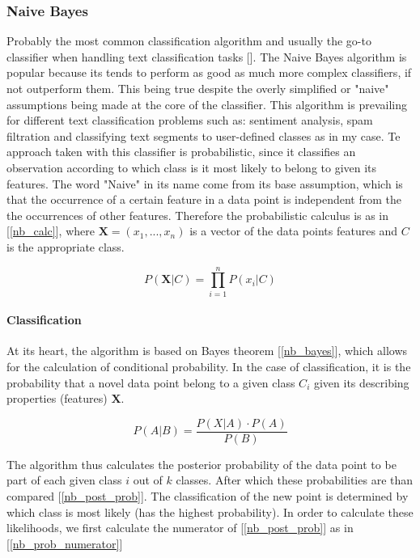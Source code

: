 \subsubsection{Naive Bayes}
	Probably the most common classification algorithm and usually the go-to classifier when handling text classification tasks [\cite{rish2001empirical}]. The Naive Bayes algorithm is popular because its tends to perform as good as much more complex classifiers, if not outperform them. This being true despite the overly simplified or "naive" assumptions being made at the core of the classifier. This algorithm is prevailing for different text classification problems such as: sentiment analysis, spam filtration and classifying text segments to user-defined classes as in my case. Te approach taken with this classifier is probabilistic, since it classifies an observation according to which class is it most likely to belong to given its features. 
	The word "Naive" in its name come from its base assumption, which is that the occurrence of a certain feature in a data point is independent from the the occurrences of other features. Therefore the probabilistic calculus is as in [\ref{nb_calc}], where $ \textbf{X} = (x_1,...,x_n) $ is a vector of the data points features and $ C $ is the appropriate class.
	
	\begin{equation}
		P(\textbf{X}|C) = \prod_{i=1}^n P(x_i|C)
		\label{nb_calc}
	\end{equation}
	
	\paragraph{Classification}
		At its heart, the algorithm is based on Bayes theorem [\ref{nb_bayes}], which allows for the calculation of conditional probability. In the case of classification, it is the probability that a novel data point belong to a given class $ C_i $ given its describing properties (features) $ \textbf{X} $.
	
	\begin{equation}
		P(A|B) = \frac{P(X|A) \cdot P(A)}{P(B)}
		\label{nb_bayes}
	\end{equation}
	
		The algorithm thus calculates the posterior probability of the data point to be part of each given class $ i $  out of $ k $ classes. After which these probabilities are than compared [\ref{nb_post_prob}]. The classification of the new point is determined by which class is most likely (has the highest probability). In order to calculate these likelihoods, we first calculate the numerator of [\ref{nb_post_prob}] as in [\ref{nb_prob_numerator}]
	
